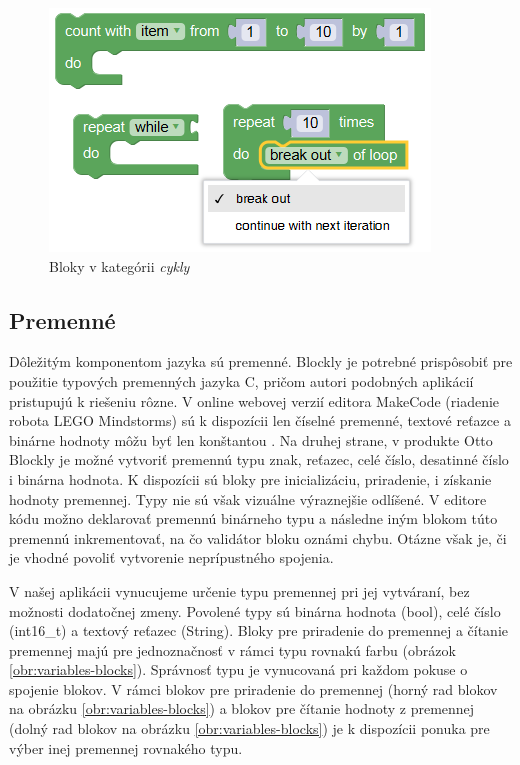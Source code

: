\begin{figure}
\centerline{\includegraphics[]{images/loop-blocks}}
\caption[Bloky v kategórii \textit{cykly}]{Bloky v kategórii \textit{cykly}}
\label{obr:loop-blocks}
\end{figure}


\subsection{Premenné}
Dôležitým komponentom jazyka sú premenné. Blockly je potrebné prispôsobiť pre použitie typových premenných jazyka C, pričom autori podobných aplikácií pristupujú k riešeniu rôzne. V online webovej verzií editora MakeCode (riadenie robota LEGO Mindstorms) sú k dispozícii len číselné premenné, textové reťazce a binárne hodnoty môžu byť len konštantou \cite{makeCodeWebEditor}. Na druhej strane, v produkte Otto Blockly je možné vytvoriť premennú typu znak, reťazec, celé číslo, desatinné číslo i binárna hodnota. K dispozícii sú bloky pre inicializáciu, priradenie, i získanie hodnoty premennej. Typy nie sú však vizuálne výraznejšie odlíšené. V editore kódu možno deklarovať premennú binárneho typu a následne iným blokom túto premennú inkrementovať, na čo validátor bloku oznámi chybu. Otázne však je, či je vhodné povoliť vytvorenie neprípustného spojenia.

V našej aplikácii vynucujeme určenie typu premennej pri jej vytváraní, bez možnosti dodatočnej zmeny. Povolené typy sú binárna hodnota (bool), celé číslo (int16\_t) a textový reťazec (String). Bloky pre priradenie do premennej a čítanie premennej majú pre jednoznačnosť v rámci typu rovnakú farbu (obrázok \ref{obr:variables-blocks}). Správnosť typu je vynucovaná pri každom pokuse o spojenie blokov. V rámci blokov pre priradenie do premennej (horný rad blokov na obrázku \ref{obr:variables-blocks}) a blokov pre čítanie hodnoty z premennej (dolný rad blokov na obrázku \ref{obr:variables-blocks}) je k dispozícii ponuka pre výber inej premennej rovnakého typu.

